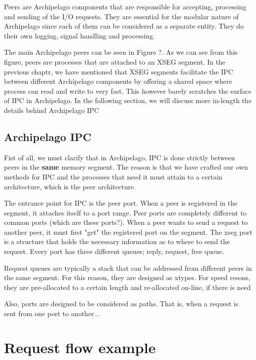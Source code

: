 Peers are Archipelago components that are responsible for accepting, processing 
and sending of the I/O requests. They are essential for the modular nature of 
Archipelago since each of them can be considered as a separate entity. They do 
their own logging, signal handling and processing.

The main Archipelago peers can be seen in Figure ?. As we can see from this 
figure, peers are processes that are attached to an XSEG segment. In the 
previous chaptr, we have mentioned that XSEG segments facilitate the IPC between 
different Archipelago components by offering a shared space where process can 
read and write to very fast. This however barely scratches the surface of IPC in 
Archipelago. In the following section, we will discuss more in-length the 
details behind Archipelago IPC

\subsection{Archipelago IPC}\label{sec:arch-ipc}

Fist of all, we must clarify that in Archipelago, IPC is done strictly between 
peers in the \textbf{same} memory segment. The reason is that we have crafted 
our own methods for IPC and the processes that need it must attain to a certain 
architecture, which is the peer architecture.

The entrance point for IPC is the peer port. When a peer is registered in the 
segment, it attaches itself to a port range. Peer ports are completely different 
to common ports (which are these ports?). When a peer wants to send a request to 
another peer, it must first "get" the registered port on the segment. The xseg 
port is a structure that holds the necessary information as to where to send the 
request. Every port has three different queues; reply, request, free queue.

Request queues are typically a stack that can be addressed from different peers 
in the same segment. For this reason, they are designed as xtypes. For speed 
resons, they are pre-allocated to a certain length and re-allocated on-line, if 
there is need

Also, ports are designed to be considered as paths. That is, when a request is 
sent from one port to another...

\section{Request flow example}

